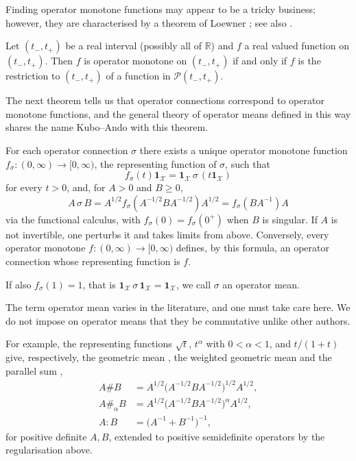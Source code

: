 Finding operator monotone functions may appear to be a tricky business; however, they are characterised by a theorem of Loewner \cite{Loewner1934}; see also \cite[Chapter~V]{bhatia1997matrix}. 
\begin{theorem}\label{cont:Loewner}
Let $(t_-,t_+)$ be a real interval (possibly all of $\mathbb{R}$) and $f$ a real valued function on $(t_-,t_+)$. Then $f$ is operator monotone on $(t_-,t_+)$ if and only if $f$ is the restriction to $(t_-,t_+)$ of a function in $\mathcal{P}(t_-,t_+)$. 
\end{theorem}
The next theorem tells us that operator connections correspond to operator monotone functions, and the general theory of operator means defined in this way shares the name Kubo--Ando with this theorem. 
 
\begin{theorem}\label{cont:kubo-ando}
For each operator connection $\sigma$ there exists a unique operator monotone function $f_\sigma:(0,\infty)\to[0,\infty)$, the representing function of $\sigma$, such that 
\[
    f_\sigma(t)\mathbf{1}_{\mathcal{X}}=\mathbf{1}_{\mathcal{X}}\,\sigma\,(t\mathbf{1}_{\mathcal{X}}) 
\]
for every $t>0$, and, for $A>0$ and $B\geq 0$,
\[
    A\,\sigma\,B=A^{1/2}f_\sigma(A^{-1/2}BA^{-1/2})A^{1/2}=f_\sigma(BA^{-1})A
\]
via the functional calculus, with $f_\sigma(0)=f_\sigma(0^+)$ when $B$ is singular. If $A$ is not invertible, one perturbs it and takes limits from above. Conversely, every operator monotone $f:(0,\infty)\to[0,\infty)$ defines, by this formula, an operator connection whose representing function is $f$.
\end{theorem}
 
\begin{definition}
    If also $f_\sigma(1)=1$, that is $\mathbf{1}_{\mathcal{X}}\,\sigma\,\mathbf{1}_{\mathcal{X}}=\mathbf{1}_{\mathcal{X}}$, we call $\sigma$ an operator mean.
\end{definition}
\begin{remark}
    The term operator mean varies in the literature, and one must take care here. We do not impose on operator means that they be commutative unlike other authors.
\end{remark}
For example, the representing functions $\sqrt{t}$, $t^\alpha$ with $0<\alpha<1$, and $t/(1+t)$ give, respectively, the geometric mean \cite{PuszWoronowicz1975,KuboAndo1980}, the weighted geometric mean \cite{KuboAndo1980} and the parallel sum \cite{AndersonDuffin1969},
\begin{align*}
A\#B&=A^{1/2}\big(A^{-1/2}BA^{-1/2}\big)^{1/2}A^{1/2},\\
A\#_\alpha B&=A^{1/2}\big(A^{-1/2}BA^{-1/2}\big)^{\alpha}A^{1/2},\\
A:B&=\big(A^{-1}+B^{-1}\big)^{-1},
\end{align*}
for positive definite $A,B$, extended to positive semidefinite operators by the regularisation above.
 
